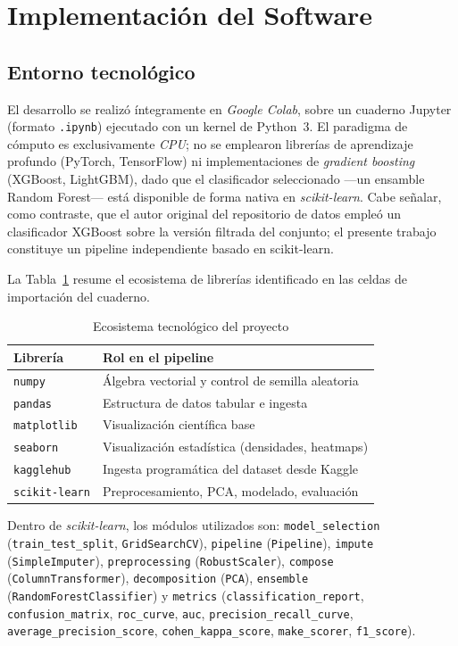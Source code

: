 \section{Implementación del Software}\label{sec:implementation}

\subsection{Entorno tecnológico}
El desarrollo se realizó íntegramente en \emph{Google Colab}, sobre un cuaderno
Jupyter (formato \texttt{.ipynb}) ejecutado con un kernel de Python~3. El
paradigma de cómputo es exclusivamente \emph{CPU}; no se emplearon librerías de
aprendizaje profundo (PyTorch, TensorFlow) ni implementaciones de \emph{gradient
boosting} (XGBoost, LightGBM), dado que el clasificador seleccionado ---un
ensamble Random Forest--- está disponible de forma nativa en \emph{scikit-learn}.
Cabe señalar, como contraste, que el autor original del repositorio de datos
empleó un clasificador XGBoost sobre la versión filtrada del conjunto; el presente
trabajo constituye un pipeline independiente basado en scikit-learn.

La Tabla~\ref{tab:stack} resume el ecosistema de librerías identificado en las
celdas de importación del cuaderno.

\begin{table}[H]
\centering
\caption{Ecosistema tecnológico del proyecto}
\label{tab:stack}
\footnotesize
\renewcommand{\arraystretch}{1.2}
\begin{tabular}{p{2.2cm}p{5.4cm}}
\toprule
\textbf{Librería} & \textbf{Rol en el pipeline} \\
\midrule
\texttt{numpy} & Álgebra vectorial y control de semilla aleatoria \\
\texttt{pandas} & Estructura de datos tabular e ingesta \\
\texttt{matplotlib} & Visualización científica base \\
\texttt{seaborn} & Visualización estadística (densidades, heatmaps) \\
\texttt{kagglehub} & Ingesta programática del dataset desde Kaggle \\
\texttt{scikit-learn} & Preprocesamiento, PCA, modelado, evaluación \\
\bottomrule
\end{tabular}
\end{table}

Dentro de \emph{scikit-learn}, los módulos utilizados son:
\texttt{model\_selection} (\texttt{train\_test\_split}, \texttt{GridSearchCV}),
\texttt{pipeline} (\texttt{Pipeline}), \texttt{impute} (\texttt{SimpleImputer}),
\texttt{preprocessing} (\texttt{RobustScaler}), \texttt{compose}
(\texttt{ColumnTransformer}), \texttt{decomposition} (\texttt{PCA}),
\texttt{ensemble} (\texttt{RandomForestClassifier}) y \texttt{metrics}
(\texttt{classification\_report}, \texttt{confusion\_matrix},
\texttt{roc\_curve}, \texttt{auc}, \texttt{precision\_recall\_curve},
\texttt{average\_precision\_score}, \texttt{cohen\_kappa\_score},
\texttt{make\_scorer}, \texttt{f1\_score}).

